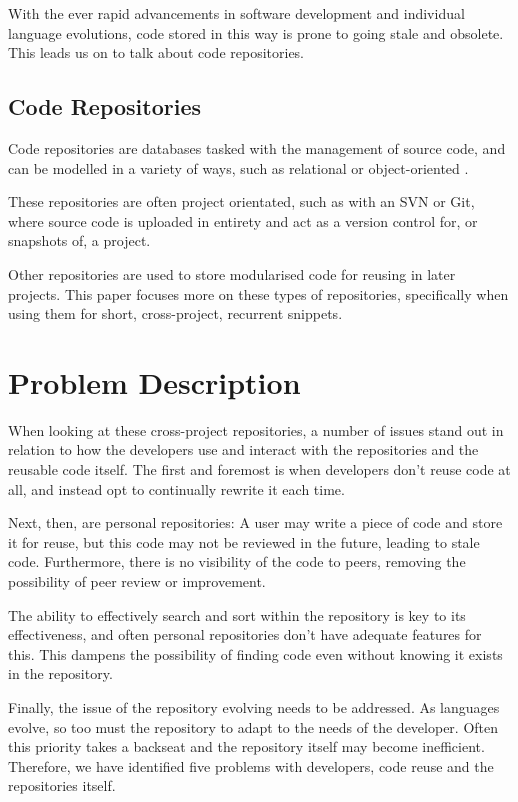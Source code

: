 \documentclass[11pt,openright,a4paper]{report}
\begin{document}
With the ever rapid advancements in software development and individual language evolutions, code stored in this way is prone to going stale and obsolete. 
This leads us on to talk about code repositories.

\subsection{Code Repositories}
Code repositories are databases tasked with the management of source code, and can be modelled in a variety of ways, such as relational or object-oriented \cite{Cox1999}.

These repositories are often project orientated, such as with an SVN or Git, where source code is uploaded in entirety and act as a version control for, or snapshots of, a project.

Other repositories are used to store modularised code for reusing in later projects. 
This paper focuses more on these types of repositories, specifically when using them for short, cross-project, recurrent snippets.

\section{Problem Description}
When looking at these cross-project repositories, a number of issues stand out in relation to how the developers use and interact with the repositories and the reusable code itself. 
The first and foremost is when developers don’t reuse code at all, and instead opt to continually rewrite it each time.

Next, then, are personal repositories: A user may write a piece of code and store it for reuse, but this code may not be reviewed in the future, leading to stale code. 
Furthermore, there is no visibility of the code to peers, removing the possibility of peer review or improvement.

The ability to effectively search and sort within the repository is key to its effectiveness, and often personal repositories don’t have adequate features for this.
This dampens the possibility of finding code even without knowing it exists in the repository.

Finally, the issue of the repository evolving needs to be addressed. 
As languages evolve, so too must the repository to adapt to the needs of the developer. 
Often this priority takes a backseat and the repository itself may become inefficient. 
Therefore, we have identified five problems with developers, code reuse and the repositories itself.
\end{document}
